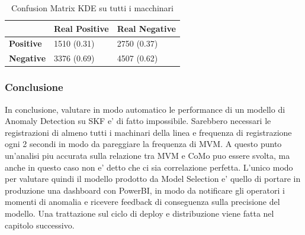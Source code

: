 \begin{table}[]
\centering
	\begin{tabular}{|l|l|l|}
		\hline
		                  & \textbf{Real Positive} & \textbf{Real Negative} \\ \hline
		\textbf{Positive} & 1510 (0.31)            & 2750 (0.37)            \\ \hline
		\textbf{Negative} & 3376 (0.69)            & 4507 (0.62)            \\ \hline
	\end{tabular}
    \caption{\label{cm_quality_all}Confusion Matrix KDE su tutti i macchinari}

\end{table}

\subsubsection{Conclusione}
In conclusione, valutare in modo automatico le performance di un modello di Anomaly Detection su SKF e' di fatto impossibile. Sarebbero necessari le registrazioni di almeno tutti i machinari della linea e frequenza di registrazione ogni 2 secondi in modo da pareggiare la frequenza di MVM. A questo punto un'analisi piu accurata sulla relazione tra MVM e CoMo puo essere svolta, ma anche in questo caso non e' detto che ci sia correlazione perfetta.
L'unico modo per valutare quindi il modello prodotto da Model Selection e' quello di portare in produzione una dashboard con PowerBI, in modo da notificare gli operatori i momenti di anomalia e ricevere feedback di conseguenza sulla precisione del modello.
Una trattazione sul ciclo di deploy e distribuzione viene fatta nel capitolo successivo.
